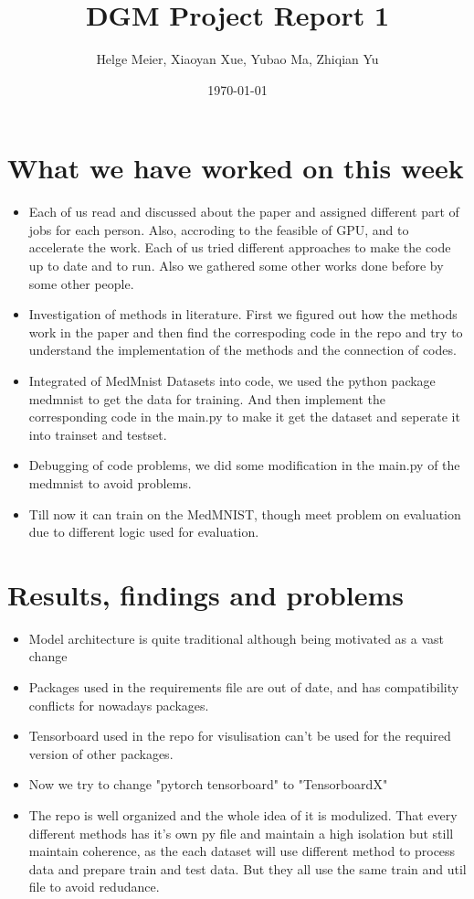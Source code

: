 \documentclass[
	ngerman,
	accentcolor=9c,%
	type=intern,
	marginpar=false
	]{tudapub}
\begin{document}
\title{DGM Project Report 1}
\author{Helge Meier, Xiaoyan Xue,  Yubao Ma, Zhiqian Yu}
\date{\today}

\maketitle

\section{What we have worked on this week}
\begin{itemize}
    \item Each of us read and discussed about the paper and assigned different part of jobs for each person. Also, accroding to the feasible of GPU, and to accelerate the work. Each of us tried different approaches to make the code up to date and to run. Also we gathered some other works done before by some other people. 
    \item Investigation of methods in literature. First we figured out how the methods work in the paper and then find the correspoding code in the repo and try to understand the implementation of the methods and the connection of codes.
    \item Integrated of MedMnist Datasets into code, we used the python package medmnist to get the data for training. And then implement the corresponding code in the main.py to make it get the dataset and seperate it into trainset and testset. 
    \item Debugging of code problems, we did some modification in the main.py of the medmnist to avoid problems.
    \item Till now it can train on the MedMNIST, though meet problem on evaluation due to different logic used for evaluation. 
\end{itemize}

\section{Results, findings and problems}
\begin{itemize}
    \item Model architecture is quite traditional although being motivated as a vast change
    \item Packages used in the requirements file are out of date, and has compatibility conflicts for nowadays packages.
    \item Tensorboard used in the repo for visulisation can't be used for the required version of other packages.
    \item Now we try to change "pytorch tensorboard" to "TensorboardX"
    \item The repo is well organized and the whole idea of it is modulized. That every different methods has it's own py file and maintain a high isolation but still maintain coherence, as the each dataset will use different method to process data and prepare train and test data. But they all use the same train and util file to avoid redudance. 
\end{itemize}
\end{document}
